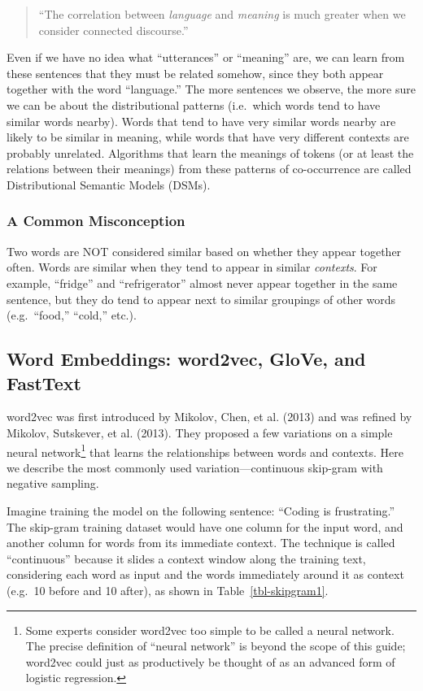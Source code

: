 \documentclass[
  man,
  floatsintext,
  longtable,
  nolmodern,
  notxfonts,
  notimes,
  colorlinks=true,linkcolor=blue,citecolor=blue,urlcolor=blue]{apa7}
\begin{document}
\begin{quote}
``The correlation between \emph{language} and \emph{meaning} is much
greater when we consider connected discourse.''
\end{quote}

Even if we have no idea what ``utterances'' or ``meaning'' are, we can
learn from these sentences that they must be related somehow, since they
both appear together with the word ``language.'' The more sentences we
observe, the more sure we can be about the distributional patterns
(i.e.~which words tend to have similar words nearby). Words that tend to
have very similar words nearby are likely to be similar in meaning,
while words that have very different contexts are probably unrelated.
Algorithms that learn the meanings of tokens (or at least the relations
between their meanings) from these patterns of co-occurrence are called
Distributional Semantic Models (DSMs).

\subsubsection{A Common Misconception}\label{a-common-misconception}

Two words are NOT considered similar based on whether they appear
together often. Words are similar when they tend to appear in similar
\emph{contexts}. For example, ``fridge'' and ``refrigerator'' almost
never appear together in the same sentence, but they do tend to appear
next to similar groupings of other words (e.g.~``food,'' ``cold,''
etc.).

\subsection{Word Embeddings: word2vec, GloVe, and
FastText}\label{word-embeddings-word2vec-glove-and-fasttext}

word2vec was first introduced by Mikolov, Chen, et al. (2013) and was
refined by Mikolov, Sutskever, et al. (2013). They proposed a few
variations on a simple neural network\footnote{Some experts consider
  word2vec too simple to be called a neural network. The precise
  definition of ``neural network'' is beyond the scope of this guide;
  word2vec could just as productively be thought of as an advanced form
  of logistic regression.} that learns the relationships between words
and contexts. Here we describe the most commonly used
variation---continuous skip-gram with negative sampling.

Imagine training the model on the following sentence: ``Coding is
frustrating.'' The skip-gram training dataset would have one column for
the input word, and another column for words from its immediate context.
The technique is called ``continuous'' because it slides a context
window along the training text, considering each word as input and the
words immediately around it as context (e.g.~10 before and 10 after), as
shown in Table~\ref{tbl-skipgram1}.
\end{document}
